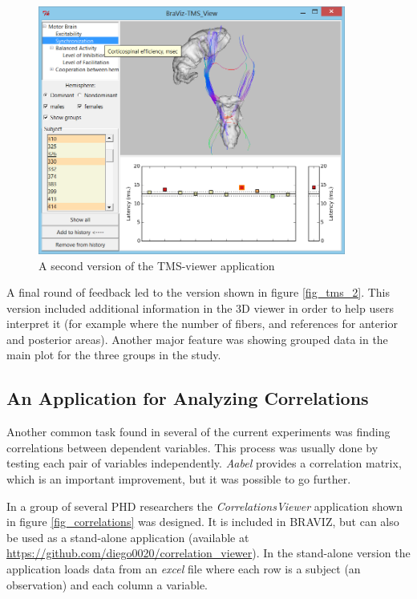 \begin{figure}
	\centering
		\includegraphics[width=0.90\textwidth]{figures/analysis/tms_view_motor}
	\caption{A second version of the TMS-viewer application}
	\label{fig_tms_view_second}
\end{figure}

A final round of feedback led to the version shown in figure \ref{fig_tms_2}. This version included additional information in the 3D viewer in order to help users interpret it (for example where the number of fibers, and references for anterior and posterior areas). Another major feature was showing grouped data in the main plot for the three groups in the study.



\subsection{An Application for Analyzing Correlations}

Another common task found in several of the current experiments was finding correlations between dependent variables. This process was usually done by testing each pair of variables independently. \emph{Aabel} provides a correlation matrix, which is an important improvement, but it was possible to go further. 

In a group of several PHD researchers the \emph{CorrelationsViewer} application shown in figure \ref{fig_correlations} was designed. It is included in BRAVIZ, but can also be used as a stand-alone application (available at \url{https://github.com/diego0020/correlation_viewer}). In the stand-alone version the application loads data from an \emph{excel} file where each row is a subject (an observation) and each column a variable. 

